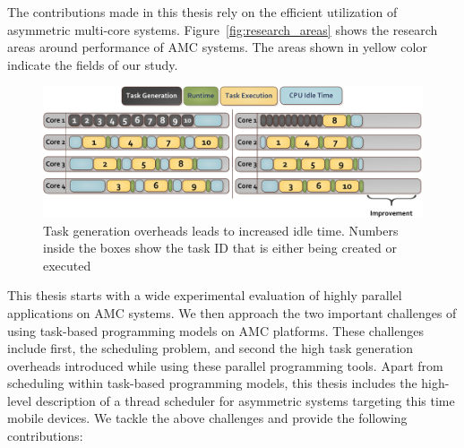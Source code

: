The contributions made in this thesis rely on the efficient utilization of asymmetric multi-core systems.
Figure~\ref{fig:research_areas} shows the research areas around performance of AMC systems.
The areas shown in yellow color indicate the fields of our study.
\begin{figure}[t]%
	\centering
	\includegraphics[width=\textwidth]{figures/taskgenx_motivation.pdf}
	\caption{Task generation overheads leads to increased idle time. Numbers inside the boxes show the task ID that is either being created or executed}
	\label{fig:taskgenx_motivation}
\end{figure}
This thesis starts with a wide experimental evaluation of highly parallel applications on AMC systems. 
We then approach the two important challenges of using task-based programming models on AMC platforms.
These challenges include first, the scheduling problem, and second the high task generation overheads introduced while using these parallel programming tools.
Apart from scheduling within task-based programming models, this thesis includes the high-level description of a thread scheduler for asymmetric systems targeting this time mobile devices.
We tackle the above challenges and provide the following contributions:

